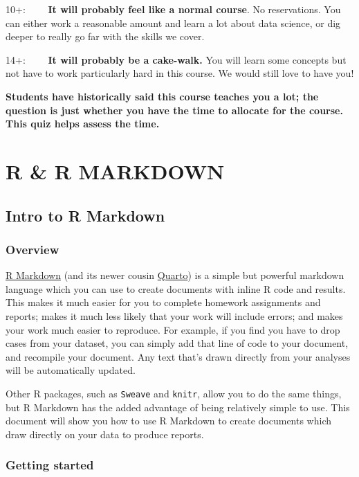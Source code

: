 \documentclass[
  letterpaper,
  DIV=11,
  numbers=noendperiod]{scrreprt}
\begin{document}
10+:~~~~ \textbf{It will probably feel like a normal course}. No
reservations. You can either work a reasonable amount and learn a lot
about data science, or dig deeper to really go far with the skills we
cover.

14+:~~~~ \textbf{It will probably be a cake-walk.} You will learn some
concepts but not have to work particularly hard in this course. We would
still love to have you!

\textbf{Students have historically said this course teaches you a lot;
the question is just whether you have the time to allocate for the
course. This quiz helps assess the time.}

\part{R \& R MARKDOWN}

\hypertarget{intro-to-r-markdown}{%
\chapter{Intro to R Markdown}\label{intro-to-r-markdown}}

\hypertarget{overview-1}{%
\section{Overview}\label{overview-1}}

\href{https://bookdown.org/yihui/rmarkdown/}{R Markdown} (and its newer
cousin \href{https://quarto.org/}{Quarto}) is a simple but powerful
markdown language which you can use to create documents with inline R
code and results. This makes it much easier for you to complete homework
assignments and reports; makes it much less likely that your work will
include errors; and makes your work much easier to reproduce. For
example, if you find you have to drop cases from your dataset, you can
simply add that line of code to your document, and recompile your
document. Any text that's drawn directly from your analyses will be
automatically updated.

Other R packages, such as \texttt{Sweave} and \texttt{knitr}, allow you
to do the same things, but R Markdown has the added advantage of being
relatively simple to use. This document will show you how to use R
Markdown to create documents which draw directly on your data to produce
reports.

\hypertarget{getting-started}{%
\section{Getting started}\label{getting-started}}
\end{document}
